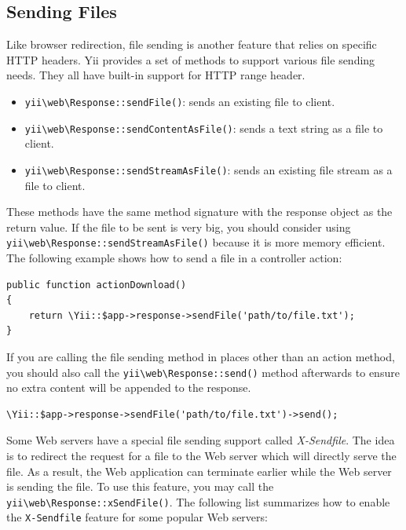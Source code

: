 \subsection{Sending Files \label{runtime-responses.md::sending-files}}
Like browser redirection, file sending is another feature that relies on specific HTTP headers. Yii provides
a set of methods to support various file sending needs. They all have built-in support for HTTP range header.

\begin{itemize}
\item \texttt{yii{\allowbreak{}\textbackslash}web{\allowbreak{}\textbackslash}Response\allowbreak{}::\allowbreak{}sendFile()}: sends an existing file to client.
\item \texttt{yii{\allowbreak{}\textbackslash}web{\allowbreak{}\textbackslash}Response\allowbreak{}::\allowbreak{}sendContentAsFile()}: sends a text string as a file to client.
\item \texttt{yii{\allowbreak{}\textbackslash}web{\allowbreak{}\textbackslash}Response\allowbreak{}::\allowbreak{}sendStreamAsFile()}: sends an existing file stream as a file to client. 
\end{itemize}
These methods have the same method signature with the response object as the return value. If the file
to be sent is very big, you should consider using \texttt{yii{\allowbreak{}\textbackslash}web{\allowbreak{}\textbackslash}Response\allowbreak{}::\allowbreak{}sendStreamAsFile()} because it is more
memory efficient. The following example shows how to send a file in a controller action:

\lstset{language=php}\begin{lstlisting}
public function actionDownload()
{
    return \Yii::$app->response->sendFile('path/to/file.txt');
}
\end{lstlisting}
If you are calling the file sending method in places other than an action method, you should also call
the \texttt{yii{\allowbreak{}\textbackslash}web{\allowbreak{}\textbackslash}Response\allowbreak{}::\allowbreak{}send()} method afterwards to ensure no extra content will be appended to the response.

\lstset{language=php}\begin{lstlisting}
\Yii::$app->response->sendFile('path/to/file.txt')->send();
\end{lstlisting}
Some Web servers have a special file sending support called \textit{X-Sendfile}. The idea is to redirect the
request for a file to the Web server which will directly serve the file. As a result, the Web application
can terminate earlier while the Web server is sending the file. To use this feature, you may call
the \texttt{yii{\allowbreak{}\textbackslash}web{\allowbreak{}\textbackslash}Response\allowbreak{}::\allowbreak{}xSendFile()}. The following list summarizes how to enable the \lstinline|X-Sendfile| feature
for some popular Web servers:

